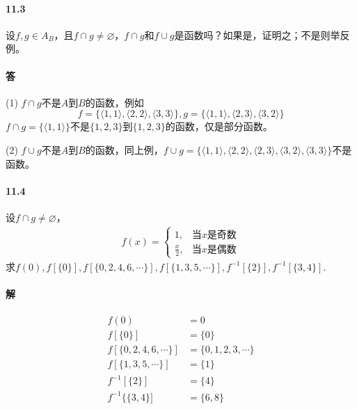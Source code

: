 \documentclass[UTF8]{ctexart}
\begin{document}
\paragraph{11.3} \label{11.3}
    设$f,g\in A_B$，且$f \cap g \neq \varnothing$，$f \cap g$和$f \cup g$是函数吗？如果是，证明之；不是则举反例。

\paragraph{答}
    (1) $f \cap g$不是$A$到$B$的函数，例如
    $$f= \{ \langle 1,1 \rangle , \langle 2,2 \rangle , \langle 3,3 \rangle \} , g= \{ \langle 1,1 \rangle , \langle 2,3 \rangle , \langle 3,2 \rangle \} $$
    $f \cap g = \{ \langle 1,1 \rangle \} $不是$\{1,2,3\}$到$\{1,2,3\}$的函数，仅是部分函数。
    
    (2) $f \cup g$不是$A$到$B$的函数，同上例，$f \cup g = \{ \langle 1,1 \rangle , \langle 2,2 \rangle , \langle 2,3 \rangle , \langle 3,2 \rangle , \langle 3,3 \rangle \} $不是函数。

\paragraph{11.4} \label{11.4}
    设$f \cap g \neq \varnothing$，
    \begin{gather*}
        f(x) = \left\{\begin{aligned}1, &\text{当}x\text{是奇数} \\ \frac{x}{2}, & \text{当}x\text{是偶数}\end{aligned}\right.
    \end{gather*}
    求$f(0), f[ \{ 0 \} ], f[ \{ 0,2,4,6,\cdots \} ], f[ \{ 1,3,5,\cdots \} ], f^ { -1 } [ \{ 2 \} ], f^ { -1 } [ \{ 3,4 \} ]$.

\paragraph{解}
    \begin{align*}
        f(0) & = 0 \\
        f[ \{ 0 \} ] & = \{ 0 \} \\
        f[ \{ 0,2,4,6,\cdots \} ] & = \{ 0,1,2,3,\cdots \} \\
        f[ \{ 1,3,5,\cdots \} ] & = \{ 1 \} \\
        f^{-1}[ \{ 2 \} ] & = \{ 4 \} \\
        f^{-1} \{ \{ 3,4 \} ] & = \{ 6,8 \} \\ 
    \end{align*}
\end{document}

